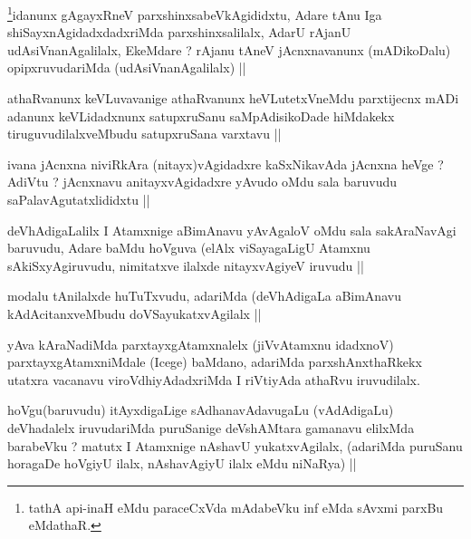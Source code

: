 \begin{artha}
\footnote{tathA api-inaH eMdu paraceCxVda mAdabeVku inf eMda sAvxmi parxBu eMdathaR.}idanunx gAgayxRneV parxshinxsabeVkAgididxtu, Adare tAnu Iga shiSayxnAgidadxdadxriMda parxshinxsalilalx, AdarU rAjanU udAsiVnanAgalilalx, EkeMdare ? rAjanu tAneV jAcnxnavanunx (mADikoDalu) opipxruvudariMda (udAsiVnanAgalilalx) ||
\end{artha}

\begin{artha}
athaRvanunx keVLuvavanige athaRvanunx heVLutetxVneMdu parxtijecnx mADi adanunx keVLidadxnunx satupxruSanu saMpAdisikoDade hiMdakekx tiruguvudilalxveMbudu satupxruSana varxtavu ||
\end{artha}

\begin{artha}
ivana jAcnxna niviRkAra (nitayx)vAgidadxre kaSxNikavAda jAcnxna heVge ? AdiVtu ? jAcnxnavu anitayxvAgidadxre yAvudo oMdu sala baruvudu saPalavAgutatxlididxtu ||
\end{artha}


\begin{artha}
deVhAdigaLalilx I Atamxnige aBimAnavu yAvAgaloV oMdu sala sakAraNavAgi baruvudu, Adare baMdu hoVguva (elAlx viSayagaLigU Atamxnu sAkiSxyAgiruvudu, nimitatxve ilalxde nitayxvAgiyeV iruvudu ||
\end{artha}


\begin{artha}
modalu tAnilalxde huTuTxvudu, adariMda (deVhAdigaLa aBimAnavu kAdAcitanxveMbudu doVSayukatxvAgilalx ||
\end{artha}

\begin{artha}
yAva kAraNadiMda parxtayxgAtamxnalelx (jiVvAtamxnu idadxnoV) parxtayxgAtamxniMdale (Icege) baMdano, adariMda parxshAnxthaRkekx utatxra vacanavu viroVdhiyAdadxriMda I riVtiyAda athaRvu iruvudilalx.
\end{artha}

\begin{artha}
hoVgu(baruvudu) itAyxdigaLige sAdhanavAdavugaLu (vAdAdigaLu) deVhadalelx iruvudariMda puruSanige deVshAMtara gamanavu elilxMda barabeVku ? matutx I Atamxnige nAshavU yukatxvAgilalx, (adariMda puruSanu horagaDe hoVgiyU ilalx, nAshavAgiyU ilalx eMdu niNaRya) ||
\end{artha}

